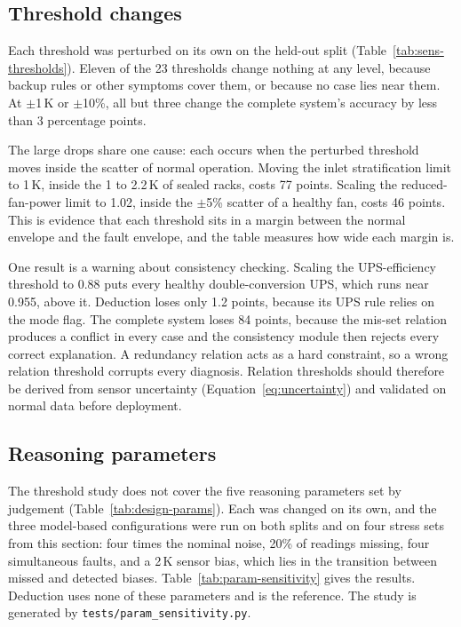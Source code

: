 \subsection{Threshold changes}

Each threshold was perturbed on its own on the held-out split (Table~\ref{tab:sens-thresholds}). Eleven of the 23 thresholds change nothing at any level, because backup rules or other symptoms cover them, or because no case lies near them. At $\pm$1\,K or $\pm$10\%, all but three change the complete system's accuracy by less than 3 percentage points.



The large drops share one cause: each occurs when the perturbed threshold moves inside the scatter of normal operation. Moving the inlet stratification limit to 1\,K, inside the 1 to 2.2\,K of sealed racks, costs 77 points. Scaling the reduced-fan-power limit to 1.02, inside the $\pm$5\% scatter of a healthy fan, costs 46 points. This is evidence that each threshold sits in a margin between the normal envelope and the fault envelope, and the table measures how wide each margin is.

One result is a warning about consistency checking. Scaling the UPS-efficiency threshold to 0.88 puts every healthy double-conversion UPS, which runs near 0.955, above it. Deduction loses only 1.2 points, because its UPS rule relies on the mode flag. The complete system loses 84 points, because the mis-set relation produces a conflict in every case and the consistency module then rejects every correct explanation. A redundancy relation acts as a hard constraint, so a wrong relation threshold corrupts every diagnosis. Relation thresholds should therefore be derived from sensor uncertainty (Equation~\eqref{eq:uncertainty}) and validated on normal data before deployment.

\subsection{Reasoning parameters}
\label{sec:param-sensitivity}

The threshold study does not cover the five reasoning parameters set by judgement (Table~\ref{tab:design-params}). Each was changed on its own, and the three model-based configurations were run on both splits and on four stress sets from this section: four times the nominal noise, 20\% of readings missing, four simultaneous faults, and a 2\,K sensor bias, which lies in the transition between missed and detected biases. Table~\ref{tab:param-sensitivity} gives the results. Deduction uses none of these parameters and is the reference. The study is generated by \texttt{tests/param\_sensitivity.py}.

